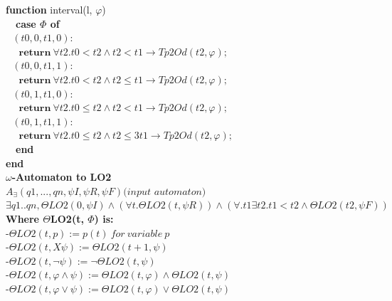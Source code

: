 \documentclass{article}
\begin{document}
\begin{multicols}{4}
\textbf{function} interval(l, $\varphi$)\\
\ \ \textbf{case $\Phi$ of} \\
$\ \ \ (t0, 0, t1, 0) : $ \\
$\ \ \ \ \ \ \textbf{return}\ \forall t2.t0 < t2 \wedge t2 < t1 \rightarrow Tp2Od(t2, \varphi);$ \\
$\ \ \ (t0, 0, t1, 1) : $ \\
$\ \ \ \ \ \ \textbf{return}\ \forall t2.t0 < t2 \wedge t2 \leq t1 \rightarrow Tp2Od(t2, \varphi);$ \\
$\ \ \ (t0, 1, t1, 0) :$ \\
$\ \ \ \ \ \ \textbf{return}\ \forall t2.t0 \leq t2 \wedge t2 < t1 \rightarrow Tp2Od(t2, \varphi);$ \\
$\ \ \ (t0, 1, t1, 1) :$ \\
$\ \ \ \ \ \ \textbf{return}\ \forall t2.t0 \leq t2 \wedge t2 \leq3 t1 \rightarrow Tp2Od(t2, \varphi);$ \\
\ \ \textbf{end} \\
\textbf{end} \\

\textbf{$\omega$-Automaton to LO2} \\
$A_{\exists}({q1,...,qn}, \psi I, \psi R, \psi F) \textit{(input automaton)}$ \\
$\exists q1..qn, \Theta LO2(0,\psi I) \wedge (\forall t.\Theta LO2(t,\psi R)) \wedge (\forall.t1\exists t2. t1 < t2 \wedge \Theta LO2(t2,\psi F))$ \\
\textbf{Where $\Theta$LO2(t, $\Phi$) is:} \\
-$\Theta LO2(t, p) := p(t)\ for\ variable\ p $ \\
-$\Theta LO2(t, X\psi) := \Theta LO2(t+1, \psi)$ \\
-$\Theta LO2(t, \neg\psi) := \neg\Theta LO2(t, \psi)$ \\
-$\Theta LO2(t, \varphi\wedge\psi) := \Theta LO2(t, \varphi) \wedge \Theta LO2(t, \psi)$ \\
-$\Theta LO2(t, \varphi\vee\psi) := \Theta LO2(t, \varphi) \vee \Theta LO2(t, \psi)$ \\


\end{multicols}
\end{document}

